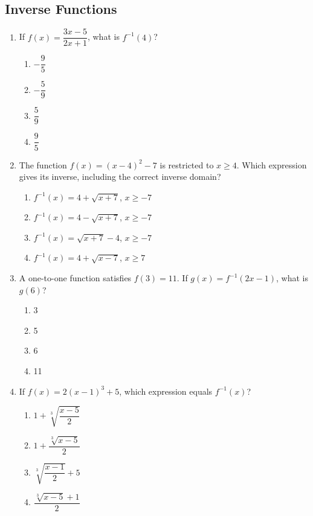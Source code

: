 \documentclass[12pt]{article}
\begin{document}
\subsection*{Inverse Functions}
\begin{enumerate}[leftmargin=*,itemsep=1em,resume]
  \item If $f(x)=\dfrac{3x-5}{2x+1}$, what is $f^{-1}(4)$?
  \begin{enumerate}[label=\Alph*.,itemsep=0pt]
    \item $-\dfrac95$ \item $-\dfrac59$ \item $\dfrac59$ \item $\dfrac95$
  \end{enumerate}

  \item The function $f(x)=(x-4)^2-7$ is restricted to $x\ge4$. Which expression gives its inverse, including the correct inverse domain?
  \begin{enumerate}[label=\Alph*.,itemsep=0pt]
    \item $f^{-1}(x)=4+\sqrt{x+7}$, $x\ge-7$
    \item $f^{-1}(x)=4-\sqrt{x+7}$, $x\ge-7$
    \item $f^{-1}(x)=\sqrt{x+7}-4$, $x\ge-7$
    \item $f^{-1}(x)=4+\sqrt{x-7}$, $x\ge7$
  \end{enumerate}

  \item A one-to-one function satisfies $f(3)=11$. If $g(x)=f^{-1}(2x-1)$, what is $g(6)$?
  \begin{enumerate}[label=\Alph*.,itemsep=0pt]
    \item 3 \item 5 \item 6 \item 11
  \end{enumerate}

  \item If $f(x)=2(x-1)^3+5$, which expression equals $f^{-1}(x)$?
  \begin{enumerate}[label=\Alph*.,itemsep=0pt]
    \item $1+\sqrt[3]{\dfrac{x-5}{2}}$
    \item $1+\dfrac{\sqrt[3]{x-5}}2$
    \item $\sqrt[3]{\dfrac{x-1}{2}}+5$
    \item $\dfrac{\sqrt[3]{x-5}+1}{2}$
  \end{enumerate}
\end{enumerate}
\end{document}
